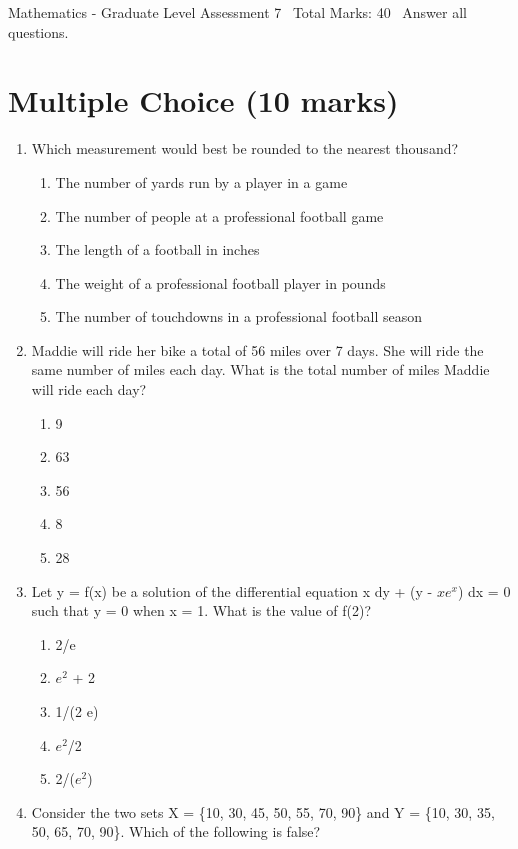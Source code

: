 \documentclass[12pt]{article}
\begin{document}
\begin{center}
Mathematics - Graduate Level Assessment 7 \
Total Marks: 40 \
Answer all questions.
\end{center}

\section*{Multiple Choice (10 marks)}
\begin{enumerate}[label=\arabic*.]
\item Which measurement would best be rounded to the nearest thousand?
\begin{enumerate}[label=(\alph*)]
    \item The number of yards run by a player in a game
    \item The number of people at a professional football game
    \item The length of a football in inches
    \item The weight of a professional football player in pounds
    \item The number of touchdowns in a professional football season
\end{enumerate}
\item Maddie will ride her bike a total of 56 miles over 7 days. She will ride the same number of miles each day. What is the total number of miles Maddie will ride each day?
\begin{enumerate}[label=(\alph*)]
    \item 9
    \item 63
    \item 56
    \item 8
    \item 28
\end{enumerate}
\item Let y = f(x) be a solution of the differential equation x dy + (y - $xe^x$) dx = 0 such that y = 0 when x = 1. What is the value of f(2)?
\begin{enumerate}[label=(\alph*)]
    \item 2/e
    \item $e^2$ + 2
    \item 1/(2 e)
    \item $e^2$/2
    \item 2/($e^2$)
\end{enumerate}
\item Consider the two sets X = \{10, 30, 45, 50, 55, 70, 90\} and Y = \{10, 30, 35, 50, 65, 70, 90\}. Which of the following is false?

\end{enumerate}
\end{document}
